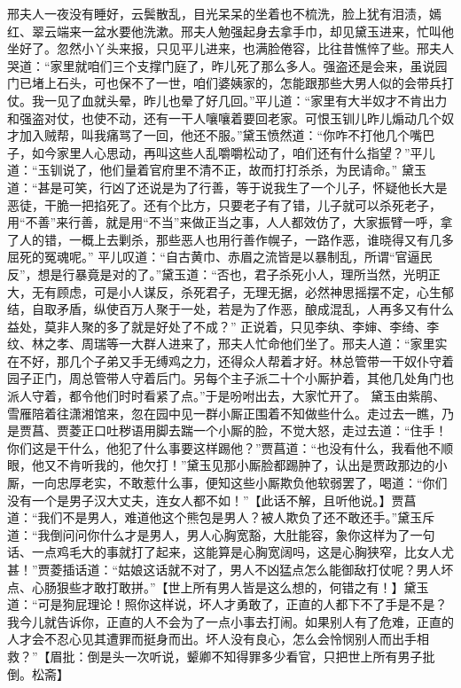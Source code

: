 \documentclass[12pt,oneside]{book}
\begin{document}
邢夫人一夜没有睡好，云鬓散乱，目光呆呆的坐着也不梳洗，脸上犹有泪渍，嫣红、翠云端来一盆水要他洗漱。邢夫人勉强起身去拿手巾，却见黛玉进来，忙叫他坐好了。忽然小丫头来报，只见平儿进来，也满脸倦容，比往昔憔悴了些。邢夫人哭道：“家里就咱们三个支撑门庭了，昨儿死了那么多人。强盗还是会来，虽说园门已堵上石头，可也保不了一世，咱们婆姨家的，怎能跟那些大男人似的会带兵打仗。我一见了血就头晕，昨儿也晕了好几回。”平儿道：“家里有大半奴才不肯出力和强盗对仗，也使不动，还有一干人嚷嚷着要回老家。可恨玉钏儿昨儿煽动几个奴才加入贼帮，叫我痛骂了一回，他还不服。”黛玉愤然道：“你咋不打他几个嘴巴子，如今家里人心思动，再叫这些人乱嚼嚼松动了，咱们还有什么指望？”平儿道：“玉钏说了，他们量着官府里不清不正，故而打打杀杀，为民请命。”
黛玉道：“甚是可笑，行凶了还说是为了行善，等于说我生了一个儿子，怀疑他长大是恶徒，干脆一把掐死了。还有个比方，只要老子有了错，儿子就可以杀死老子，用“不善”来行善，就是用“不当”来做正当之事，人人都效仿了，大家振臂一呼，拿了人的错，一概上去剿杀，那些恶人也用行善作幌子，一路作恶，谁晓得又有几多屈死的冤魂呢。”
平儿叹道：“自古黄巾、赤眉之流皆是以暴制乱，所谓“官逼民反”，想是行暴竟是对的了。”黛玉道：“否也，君子杀死小人，理所当然，光明正大，无有顾虑，可是小人谋反，杀死君子，无理无据，必然神思摇摆不定，心生郁结，自取矛盾，纵使百万人聚于一处，若是为了作恶，酿成混乱，人再多又有什么益处，莫非人聚的多了就是好处了不成？”
正说着，只见李纨、李婶、李绮、李纹、林之孝、周瑞等一大群人进来了，邢夫人忙命他们坐了。邢夫人道：“家里实在不好，那几个子弟又手无缚鸡之力，还得众人帮着才好。林总管带一干奴仆守着园子正门，周总管带人守着后门。另每个主子派二十个小厮护着，其他几处角门也派人守着，都令他们时时看紧了点。”于是吩咐出去，大家忙开了。
黛玉由紫鹃、雪雁陪着往潇湘馆来，忽在园中见一群小厮正围着不知做些什么。走过去一瞧，乃是贾菖、贾菱正口吐秽语用脚去踹一个小厮的脸，不觉大怒，走过去道：“住手！你们这是干什么，他犯了什么事要这样踢他？”贾菖道：“也没有什么，我看他不顺眼，他又不肯听我的，他欠打！”黛玉见那小厮脸都踢肿了，认出是贾政那边的小厮，一向忠厚老实，不敢惹什么事，便知这些小厮欺负他软弱罢了，喝道：“你们没有一个是男子汉大丈夫，连女人都不如！”【此话不解，且听他说。】贾菖道：“我们不是男人，难道他这个熊包是男人？被人欺负了还不敢还手。”黛玉斥道：“我倒问问你什么才是男人，男人心胸宽豁，大肚能容，象你这样为了一句话、一点鸡毛大的事就打了起来，这能算是心胸宽阔吗，这是心胸狭窄，比女人尤甚！”贾菱插话道：“姑娘这话就不对了，男人不凶猛点怎么能御敌打仗呢？男人坏点、心肠狠些才敢打敢拼。”【世上所有男人皆是这么想的，何错之有！】黛玉道：“可是狗屁理论！照你这样说，坏人才勇敢了，正直的人都下不了手是不是？我今儿就告诉你，正直的人不会为了一点小事去打闹。如果别人有了危难，正直的人才会不忍心见其遭罪而挺身而出。坏人没有良心，怎么会怜悯别人而出手相救？”【眉批：倒是头一次听说，颦卿不知得罪多少看官，只把世上所有男子批倒。松斋】
\end{document}
